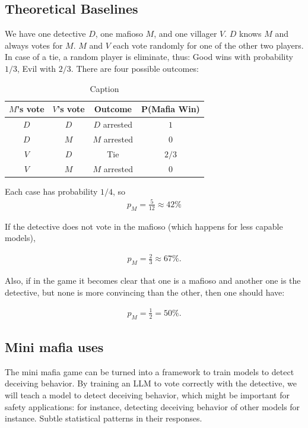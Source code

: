 \documentclass{article}
\begin{document}
\subsection{Theoretical Baselines}


We have one detective $D$, one mafioso $M$, and one villager $V$.  
$D$ knows $M$ and always votes for $M$.  
$M$ and $V$ each vote randomly for one of the other two players.  
In case of a tie, a random player is eliminate, thus: Good wins with probability $1/3$, Evil with $2/3$. There are four possible outcomes:
\begin{table}[ht]
    \centering
    \begin{tabular}{|c|c|c|c|}
        \hline
        $M$'s vote & $V$'s vote & Outcome & P(Mafia Win) \\
        \hline
        $D$ & $D$ & $D$ arrested & $1$ \\
        $D$ & $M$ & $M$ arrested & $0$ \\
        $V$ & $D$ & Tie & $2/3$ \\
        $V$ & $M$ & $M$ arrested & $0$ \\
        \hline
    \end{tabular}
    \caption{Caption}
    \label{tab:placeholder}
\end{table}
Each case has probability $1/4$, so
\begin{align}
    p_M=\frac{5}{12}\approx42\%
\end{align}

If the detective does not vote in the mafioso (which happens for less capable models), 

\begin{align}
    p_M=\frac{2}{3}\approx 67\%.
\end{align}

Also, if in the game it becomes clear that one is a mafioso and another one is the detective, but none is more convincing than the other, then one should have:

\begin{align}
    p_M=\frac{1}{2}=50\%.
\end{align}




\subsection{Mini mafia uses}

The mini mafia game can be turned into a framework to train models to detect deceiving behavior. By training an LLM to vote correctly with the detective, we will teach a model to detect deceiving behavior, which might be important for safety applications: for instance, detecting deceiving behavior of other models for instance. Subtle statistical patterns in their responses.
\end{document}
